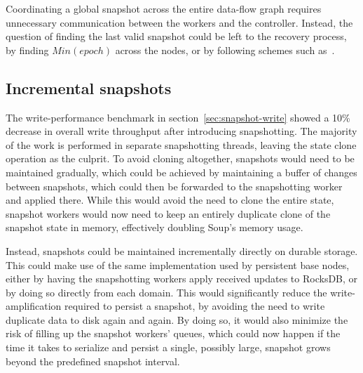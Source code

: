 Coordinating a global snapshot across the entire data-flow graph requires
unnecessary communication between the workers and the controller. Instead, the
question of finding the last valid snapshot could be left to the recovery
process, \eg by finding $ Min(epoch) $ across the nodes, or by following schemes
such as~\cite{falkirk}.

\subsection{Incremental snapshots}

The write-performance benchmark in section~\ref{sec:snapshot-write} showed a
10\% decrease in overall write throughput after introducing snapshotting. The
majority of the work is performed in separate snapshotting threads, leaving the
state clone operation as the culprit. To avoid cloning altogether, snapshots
would need to be maintained gradually, which could be achieved by maintaining a
buffer of changes between snapshots, which could then be forwarded to the
snapshotting worker and applied there. While this would avoid the need to clone
the entire state, snapshot workers would now need to keep an entirely duplicate
clone of the snapshot state in memory, effectively doubling Soup's memory usage.

Instead, snapshots could be maintained incrementally directly on durable
storage. This could make use of the same  implementation
used by persistent base nodes, either by having the snapshotting workers apply
received updates to RocksDB, or by doing so directly from each domain. This
would significantly reduce the write-amplification required to persist a
snapshot, by avoiding the need to write duplicate data to disk again and again.
By doing so, it would also minimize the risk of filling up the snapshot workers'
queues, which could now happen if the time it takes to serialize and persist a
single, possibly large, snapshot grows beyond the predefined snapshot interval.
